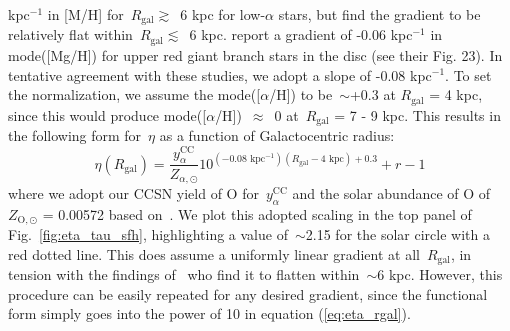 \documentclass[fleqn, usenatbib]{mnras}
\newcommand{\refp}[1]{(\ref{#1})}
\begin{document}
kpc$^{-1}$ in [M/H] for~$R_\text{gal} \gtrsim$~6 kpc for low-$\alpha$ stars, 
but find the gradient to be relatively flat within~$R_\text{gal} \lesssim$~6 
kpc. \citet{Weinberg2019} report a gradient of -0.06 kpc$^{-1}$ in mode([Mg/H]) 
for upper red giant branch stars in the disc (see their Fig. 23). In tentative 
agreement with these studies, we adopt a slope of -0.08 kpc$^{-1}$. To set the 
normalization, we assume the mode([$\alpha$/H]) to be~$\sim$+0.3 at 
$R_\text{gal}$ = 4 kpc, since this would produce mode([$\alpha$/H])~$\approx$~0 
at~$R_\text{gal}$ = 7 - 9 kpc. This results in the following form for~$\eta$ 
as a function of Galactocentric radius: 
\begin{equation} 
\eta(R_\text{gal}) = \frac{y_\alpha^\text{CC}}{Z_{\alpha,\odot}} 
10^{(-0.08\text{ kpc}^{-1})(R_\text{gal} - 4\text{ kpc}) + 0.3} + r - 1 
\label{eq:eta_rgal} 
\end{equation} 
where we adopt our CCSN yield of O for~$y_\alpha^\text{CC}$ and the solar 
abundance of O of~$Z_{\text{O},\odot}$ = 0.00572 based on~\citet{Asplund2009}. 
We plot this adopted scaling in the top panel of Fig.~\ref{fig:eta_tau_sfh}, 
highlighting a value of~$\sim$2.15 for the solar circle with a red dotted line. 
This does assume a uniformly linear gradient at all~$R_\text{gal}$, in tension 
with the findings of~\citet{Hayden2014} who find it to flatten within~$\sim$6 
kpc. However, this procedure can be easily repeated for any desired gradient, 
since the functional form simply goes into the power of 10 in equation 
\refp{eq:eta_rgal}. 
\end{document}
